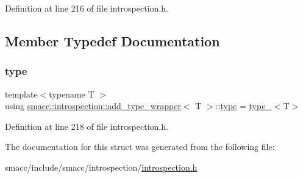 Definition at line 216 of file introspection.\+h.



\subsection{Member Typedef Documentation}
\mbox{\label{structsmacc_1_1introspection_1_1add__type__wrapper_a4390a0426686e1e115d4c3ad22165cd9}} 
\subsubsection{\texorpdfstring{type}{type}}
{\footnotesize\ttfamily template$<$typename T $>$ \\
using \hyperlink{structsmacc_1_1introspection_1_1add__type__wrapper}{smacc\+::introspection\+::add\+\_\+type\+\_\+wrapper}$<$ T $>$\+::\hyperlink{structsmacc_1_1introspection_1_1add__type__wrapper_a4390a0426686e1e115d4c3ad22165cd9}{type} =  \hyperlink{structsmacc_1_1introspection_1_1type__}{type\+\_\+}$<$T$>$}



Definition at line 218 of file introspection.\+h.



The documentation for this struct was generated from the following file\+:\begin{DoxyCompactItemize}
\item 
smacc/include/smacc/introspection/\hyperlink{introspection_8h}{introspection.\+h}\end{DoxyCompactItemize}
